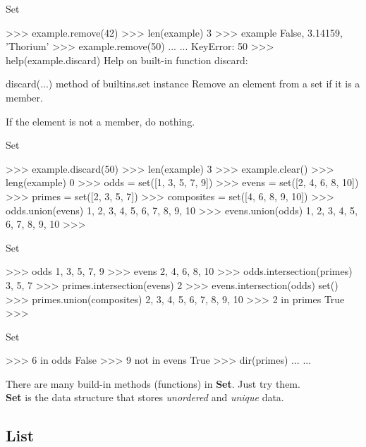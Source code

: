 \documentclass{beamer}
\begin{document}
\begin{frame}[fragile]{Set}
\begin{pythoncode}
>>> example.remove(42)
>>> len(example)
3
>>> example
{False, 3.14159, 'Thorium'}
>>> example.remove(50)
... ...
KeyError: 50
>>> help(example.discard)
Help on built-in function discard:

discard(...) method of builtins.set instance
    Remove an element from a set if it is a member.

    If the element is not a member, do nothing.
\end{pythoncode}
\end{frame}

\begin{frame}[fragile]{Set}
\begin{pythoncode}
>>> example.discard(50)
>>> len(example)
3
>>> example.clear()
>>> leng(example)
0
>>> odds = set([1, 3, 5, 7, 9])
>>> evens = set([2, 4, 6, 8, 10])
>>> primes = set([2, 3, 5, 7])
>>> composites = set([4, 6, 8, 9, 10])
>>> odds.union(evens)
{1, 2, 3, 4, 5, 6, 7, 8, 9, 10}
>>> evens.union(odds)
{1, 2, 3, 4, 5, 6, 7, 8, 9, 10}
>>> 
\end{pythoncode}
\end{frame}

\begin{frame}[fragile]{Set}
\begin{pythoncode}
>>> odds
{1, 3, 5, 7, 9}
>>> evens
{2, 4, 6, 8, 10}
>>> odds.intersection(primes)
{3, 5, 7}
>>> primes.intersection(evens)
{2}
>>> evens.intersection(odds)
set()
>>>  primes.union(composites)
{2, 3, 4, 5, 6, 7, 8, 9, 10}
>>> 2 in primes
True
>>>
\end{pythoncode}
\end{frame}

\begin{frame}[fragile]{Set}
\begin{pythoncode}
>>> 6 in odds
False
>>> 9 not in evens
True
>>> dir(primes)
... ...
\end{pythoncode}

There are many build-in methods (functions) in \textbf{Set}. Just try them.\\
\textbf{Set} is the data structure that stores \textit{unordered} and \textit{unique} data.
\end{frame}

\subsection{List}
\end{document}
